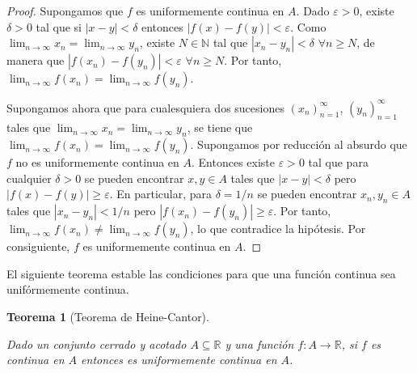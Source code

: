 \documentclass[
  a4paper,
]{scrreport}
\theoremstyle{plain}
\newtheorem{theorem}{Teorema}[chapter]
\theoremstyle{definition}
\theoremstyle{plain}
\theoremstyle{plain}
\theoremstyle{definition}
\theoremstyle{definition}
\theoremstyle{remark}
\begin{document}
\begin{tcolorbox}[enhanced jigsaw, titlerule=0mm, arc=.35mm, colframe=quarto-callout-note-color-frame, bottomrule=.15mm, opacitybacktitle=0.6, rightrule=.15mm, coltitle=black, colback=white, toprule=.15mm, title=\textcolor{quarto-callout-note-color}{\faInfo}\hspace{0.5em}{Demostración}, leftrule=.75mm, bottomtitle=1mm, opacityback=0, breakable, colbacktitle=quarto-callout-note-color!10!white, toptitle=1mm, left=2mm]

\begin{proof}
Supongamos que \(f\) es uniformemente continua en \(A\). Dado
\(\varepsilon>0\), existe \(\delta>0\) tal que si \(|x-y|<\delta\)
entonces \(|f(x)-f(y)|<\varepsilon\). Como
\(\lim_{n\to\infty}x_n=\lim_{n\to\infty}y_n\), existe \(N\in\mathbb{N}\)
tal que \(|x_n-y_n|<\delta\) \(\forall n\geq N\), de manera que
\(|f(x_n)-f(y_n)|<\varepsilon\) \(\forall n\geq N\). Por tanto,
\(\lim_{n\to\infty}f(x_n)=\lim_{n\to\infty}f(y_n)\).

Supongamos ahora que para cualesquiera dos sucesiones
\((x_n)_{n=1}^\infty\), \((y_n)_{n=1}^\infty\) tales que
\(\lim_{n\to\infty}x_n=\lim_{n\to\infty}y_n\), se tiene que
\(\lim_{n\to\infty}f(x_n)=\lim_{n\to\infty}f(y_n)\). Supongamos por
reducción al absurdo que \(f\) no es uniformemente continua en \(A\).
Entonces existe \(\varepsilon>0\) tal que para cualquier \(\delta>0\) se
pueden encontrar \(x,y\in A\) tales que \(|x-y|<\delta\) pero
\(|f(x)-f(y)|\geq \varepsilon\). En particular, para \(\delta=1/n\) se
pueden encontrar \(x_n,y_n\in A\) tales que \(|x_n-y_n|<1/n\) pero
\(|f(x_n)-f(y_n)|\geq \varepsilon\). Por tanto,
\(\lim_{n\to\infty}f(x_n)\neq\lim_{n\to\infty}f(y_n)\), lo que
contradice la hipótesis. Por consiguiente, \(f\) es uniformemente
continua en \(A\).
\end{proof}

\end{tcolorbox}

El siguiente teorema estable las condiciones para que una función
continua sea unifórmemente continua.

\begin{theorem}[Teorema de
Heine-Cantor]\protect\hypertarget{thm-funcion-uniformemente-continua}{}\label{thm-funcion-uniformemente-continua}

Dado un conjunto cerrado y acotado \(A\subseteq \mathbb{R}\) y una
función \(f:A\to \mathbb{R}\), si \(f\) es continua en \(A\) entonces es
uniformemente continua en \(A\).

\end{theorem}
\end{document}
